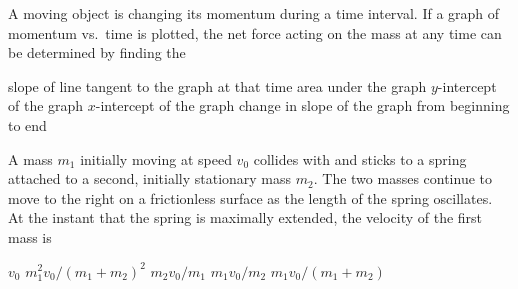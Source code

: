 \documentclass{../../oss-apphys-exam}
\newcounter{lastmc}
\begin{document}
\begin{multicols*}{2}
\begin{questions}
%
%
%    
    \columnbreak
    
    \question A moving object is changing its momentum during a time interval.
    If a graph of momentum vs.\ time is plotted, the net force acting on the
    mass at any time can be determined by finding the
    \begin{choices}
      \choice slope of line tangent to the graph at that time
      \choice area under the graph
      \choice $y$-intercept of the graph
      \choice $x$-intercept of the graph
      \choice change in slope of the graph from beginning to end
    \end{choices}
    \columnbreak
    
    \question A mass $m_1$ initially moving at speed $v_0$ collides with and
    sticks to a spring attached to a second, initially stationary mass $m_2$.
    The two masses continue to move to the right on a frictionless surface as
    the length of the spring oscillates. At the instant that the spring is
    maximally extended, the velocity of the first mass is
    \begin{center}
    \end{center}
    \begin{choices}
      \choice $v_0$
      \choice $m_1^2v_0/(m_1+m_2)^2$
      \choice $m_2v_0/m_1$
      \choice $m_1v_0/m_2$
      \choice $m_1v_0/(m_1+m_2)$
    \end{choices}
  \end{questions}
  \setcounter{lastmc}{\value{question}}
\end{multicols*}
\end{document}
